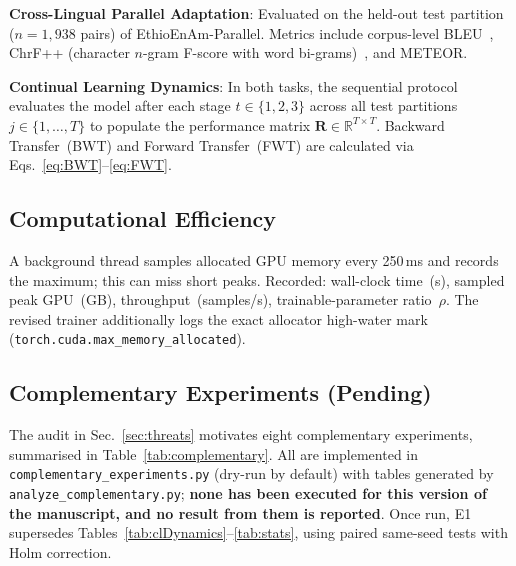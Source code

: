 \documentclass[11pt,a4paper]{article}
\begin{document}
\textbf{Cross-Lingual Parallel Adaptation}: Evaluated on the held-out test
partition ($n = 1,938$ pairs) of EthioEnAm-Parallel.  Metrics include
corpus-level BLEU~\cite{Papineni2002BLEU}, ChrF++ (character $n$-gram F-score with
word bi-grams)~\cite{Popovic2015ChrF}, and METEOR.

\textbf{Continual Learning Dynamics}: In both tasks, the sequential
protocol evaluates the model after each stage $t \in \{1, 2, 3\}$ across
all test partitions $j \in \{1, \ldots, T\}$ to populate the performance
matrix $\mathbf{R} \in \mathbb{R}^{T \times T}$.  Backward Transfer~(BWT)
and Forward Transfer~(FWT) are calculated via Eqs.~\eqref{eq:BWT}--\eqref{eq:FWT}.

\subsection{Computational Efficiency}

A background thread samples allocated GPU memory every 250\,ms and
records the maximum; this can miss short peaks.  Recorded:
wall-clock time~(s), sampled peak GPU~(GB), throughput~(samples/s),
trainable-parameter ratio~$\rho$.  The revised trainer additionally
logs the exact allocator high-water mark
(\texttt{torch.cuda.max\_memory\_allocated}).

\subsection{Complementary Experiments (Pending)}
\label{sec:complementary}

The audit in Sec.~\ref{sec:threats} motivates eight complementary
experiments, summarised in Table~\ref{tab:complementary}.  All are
implemented in \texttt{complementary\_experiments.py} (dry-run by
default) with tables generated by \texttt{analyze\_complementary.py};
\textbf{none has been executed for this version of the manuscript, and
no result from them is reported}.  Once run, E1 supersedes
Tables~\ref{tab:clDynamics}--\ref{tab:stats}, using paired same-seed
tests with Holm correction.
\end{document}
